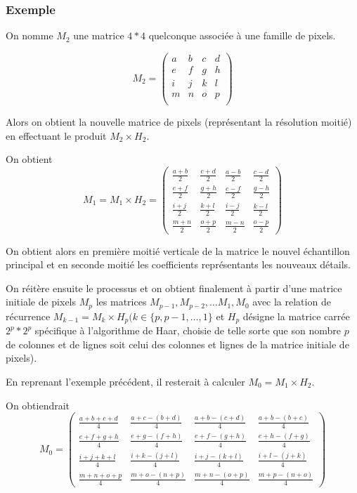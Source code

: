 \documentclass{article}
\begin{document}
\subsubsection{Exemple}

On nomme $M_2$ une matrice $4*4$ quelconque associée à une famille de pixels.

\[ M_2 = \begin{pmatrix}
 a & b & c & d \\
 e & f & g & h \\
 i & j & k & l \\
 m & n & o & p \\
\end{pmatrix} 
\]

Alors on obtient la nouvelle matrice de pixels (représentant la résolution moitié) en effectuant le produit $M_2 \times H_2$.

On obtient \[ M_1 = M_1 \times H_2 = 
\begin{pmatrix}
\frac{a+b}{2} & \frac{c+d}{2} & \frac{a-b}{2} & \frac{c-d}{2} \\
\frac{e+f}{2} & \frac{g+h}{2} & \frac{e-f}{2} & \frac{g-h}{2} \\
\frac{i+j}{2} & \frac{k+l}{2} & \frac{i-j}{2} & \frac{k-l}{2} \\
\frac{m+n}{2} & \frac{o+p}{2} & \frac{m-n}{2} & \frac{o-p}{2} 
\end{pmatrix}
\]

On obtient alors en première moitié verticale de la matrice le nouvel échantillon principal et en seconde moitié les coefficients représentants les nouveaux détails.

On réitère ensuite le processus et on obtient finalement à partir d’une matrice initiale de pixels $M_p$ les matrices $M_{p-1}, M_{p-2},… M_1, M_0$ avec la relation de récurrence $M_{k-1} = M_k \times H_p (k \in \{p,p-1,…,1\}$ et $H_p$ désigne la matrice carrée $2^p * 2^p$ spécifique à l’algorithme de Haar, choisie de telle sorte que son nombre $p$ de colonnes et de lignes soit celui des colonnes et lignes de la matrice initiale de pixels). 

En reprenant l’exemple précédent, il resterait à calculer $M_0 = M_1 \times H_2$.

On obtiendrait \[ M_0 = \begin{pmatrix}
\frac{a+b+c+d}{4} & \frac{a+c-(b+d)}{4} & \frac{a+b-(c+d)}{4} & \frac{a+b-(b+c)}{4} \\
\frac{e+f+g+h}{4} & \frac{e+g-(f+h)}{4} & \frac{e+f-(g+h)}{4} & \frac{e+h-(f+g)}{4} \\
\frac{i+j+k+l}{4} & \frac{i+k-(j+l)}{4} & \frac{i+j-(k+l)}{4} & \frac{i+l-(j+k)}{4} \\
\frac{m+n+o+p}{4} & \frac{m+o-(n+p)}{4} & \frac{m+n-(o+p)}{4} & \frac{m+p-(n+o)}{4} 
\end{pmatrix}
\]
\end{document}

